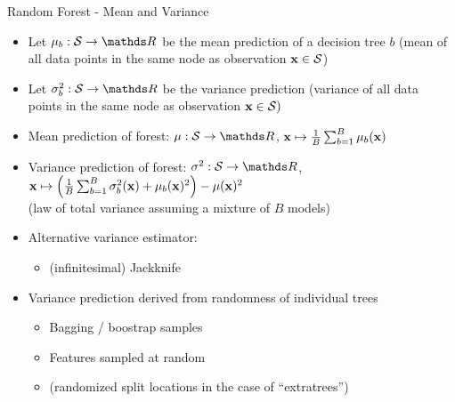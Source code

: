 \documentclass[11pt,compress,t,notes=noshow, xcolor=table]{beamer}
\begin{document}
\begin{frame}{Random Forest - Mean and Variance}

\begin{itemize}
    \item Let $\mu_b: \mathcal{S} \to \R$ be the mean prediction of a decision tree $b$ (mean of all data points in the same node as observation $\mathbf{x} \in \mathcal{S}$)
    \item Let $\sigma_{b}^2: \mathcal{S} \to \R$ be the variance prediction (variance of all data points in the same node as observation $\mathbf{x} \in \mathcal{S})$
    \item Mean prediction of forest: $\mu: \mathcal{S} \to \R$,
    $\mathbf{x} \mapsto \frac{1}{B} \sum_{b = 1}^{B} \mu_{b}(\mathbf{x})$
    \item Variance prediction of forest: $\sigma^{2}: \mathcal{S} \to \R$,\\
    $\mathbf{x} \mapsto  \left( \frac{1}{B} \sum_{b = 1}^{B} \sigma_{b}^2(\mathbf{x}) + \mu_{b}(\mathbf{x})^{2} \right) - \mu(\mathbf{x})^{2}$\\
    (law of total variance assuming a mixture of $B$ models)
    \item Alternative variance estimator:
    \begin{itemize}
        \item (infinitesimal) Jackknife
    \end{itemize}
    \item Variance prediction derived from randomness of individual trees
    \begin{itemize}
    \item Bagging / boostrap samples
    \item Features sampled at random
    \item (randomized split locations in the case of \enquote{extratrees})
    \end{itemize}
\end{itemize}

\end{frame}
\end{document}
